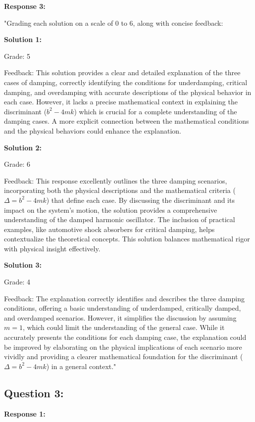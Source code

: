 \documentclass[a4paper,11pt]{article}
\begin{document}
\textbf{Response 3:}

"Grading each solution on a scale of 0 to 6, along with concise feedback:

\textbf{Solution 1:}

Grade: 5

Feedback: This solution provides a clear and detailed explanation of the three cases of damping, correctly identifying the conditions for underdamping, critical damping, and overdamping with accurate descriptions of the physical behavior in each case. However, it lacks a precise mathematical context in explaining the discriminant (\(b^2 - 4mk\)) which is crucial for a complete understanding of the damping cases. A more explicit connection between the mathematical conditions and the physical behaviors could enhance the explanation.

\textbf{Solution 2:}

Grade: 6

Feedback: This response excellently outlines the three damping scenarios, incorporating both the physical descriptions and the mathematical criteria (\(\Delta = b^2 - 4mk\)) that define each case. By discussing the discriminant and its impact on the system's motion, the solution provides a comprehensive understanding of the damped harmonic oscillator. The inclusion of practical examples, like automotive shock absorbers for critical damping, helps contextualize the theoretical concepts. This solution balances mathematical rigor with physical insight effectively.

\textbf{Solution 3:}

Grade: 4

Feedback: The explanation correctly identifies and describes the three damping conditions, offering a basic understanding of underdamped, critically damped, and overdamped scenarios. However, it simplifies the discussion by assuming \(m=1\), which could limit the understanding of the general case. While it accurately presents the conditions for each damping case, the explanation could be improved by elaborating on the physical implications of each scenario more vividly and providing a clearer mathematical foundation for the discriminant (\(\Delta = b^2 - 4mk\)) in a general context."

\subsection*{Question 3:}

\textbf{Response 1:}
\end{document}
